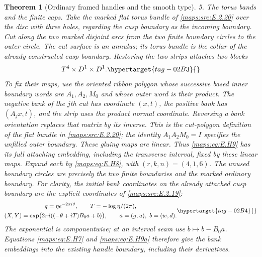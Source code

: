 \documentclass[11pt,a4paper]{article}
\numberwithin{equation}{section}
\newtheorem{theorem}{Theorem}[section]
\theoremstyle{definition}
\begin{document}
\begin{theorem}[Ordinary framed handles and the smooth type]
\emph{5. The torus bands and the finite caps.}
Take the marked flat torus bundle of \ref{maps:src:E.2.20} over the disc with
three holes, regarding the cusp boundary as the incoming boundary.
Cut along the two marked disjoint arcs from the two finite boundary
circles to the outer circle.  The cut surface is an annulus;
its torus bundle is the collar of the already constructed cusp
boundary.  Restoring the two strips attaches two blocks
\begin{equation}
                 T^4\times D^1\times D^1.
 \hypertarget{tag-02B3}{}\label{maps:eq:E.H9}
\end{equation}
To fix their maps, use the oriented ribbon
polygon whose successive based inner boundary words are
$A_1,A_2,M_0$ and whose outer word is their product.  The negative
bank of the $j$th cut has coordinate $(x,t)$, the positive bank
has $(A_jx,t)$, and the strip uses the product normal coordinate.
Reversing a bank orientation replaces that matrix by its inverse.
This is the cut-polygon definition of the flat bundle in \ref{maps:src:E.2.20};
the identity $A_1A_2M_0=I$ specifies the unfilled outer boundary.
These gluing maps are linear.  Thus \eqref{maps:eq:E.H9} has its full attaching
embedding, including the transverse interval, fixed by these
linear maps.  Expand each by \eqref{maps:eq:E.H8}, with $(r,k,n)=(4,1,6)$.
The unused boundary circles are precisely the two finite boundaries
and the marked ordinary boundary.
For clarity, the initial bank coordinates on the already attached
cusp boundary are the explicit coordinates of \cref{maps:src:E.2.19}:
\begin{equation}
 \begin{gathered}
 q=\eta e^{-2\pi i\theta},\qquad T=-\log\eta/(2\pi),\\
 (X,Y)=\exp\bigl(2\pi i((-\theta+iT)B_0a+b)\bigr),
 \qquad a=(g,u),\ b=(w,d).
 \end{gathered}
 \hypertarget{tag-02B4}{}\label{maps:eq:E.H9a}
\end{equation}
The exponential is componentwise; at an interval seam use
$b\mapsto b-B_0a$.  Equations \eqref{maps:eq:E.H7} and \eqref{maps:eq:E.H9a} therefore
give the bank embeddings into the existing handle
boundary, including their derivatives.  


\end{theorem}
\end{document}
